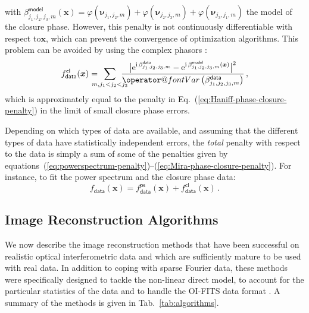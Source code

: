 \documentclass{article}
\makeatletter
\newcommand{\MathFunc}[1]{\mathop{\operator@font #1}\nolimits}
\newcommand{\Tag}[1]{\mathsf{#1}}        %
\newcommand{\V}[1]{\boldsymbol{#1}}      %
\newcommand{\Var}{\MathFunc{Var}}        %
\newcommand{\mathe}{\mathrm{e}}
\newcommand{\mathi}{\mathrm{i}}
\newcommand{\Paren}[1]{\left(#1\right)}
\newcommand{\wrt}{with respect to\xspace}
\newcommand{\Eq}[1]{Eq.~(\ref{#1})}
\newcommand{\Tab}[1]{Tab.~\ref{#1}}
\newcommand{\VisPhase}{\varphi}
\newcommand{\PhaseClosure}{\beta}
\newcommand{\Freq}{\nu}               %
\newcommand{\VFreq}{\V{\Freq}}
\newcommand{\Param}{x}
\newcommand{\VParam}{\V{\Param}}
\newcommand{\DataTag}{\Tag{data}}
\newcommand{\ModelTag}{\Tag{model}}
\newcommand{\PowerspectrumTag}{\Tag{ps}}
\newcommand{\PhaseClosureTag}{\Tag{cl}}
\newcommand{\Fcost}{f}
\newcommand{\Fdata}{\Fcost_\DataTag}
\makeatother
\begin{document}
with $\PhaseClosure_{j_1,j_2,j_3,m}^\ModelTag(\VParam) =
\VisPhase(\VFreq_{j_1,j_2,m}) + \VisPhase(\VFreq_{j_2,j_3,m}) +
\VisPhase(\VFreq_{j_3,j_1,m})$ the model of the closure phase.  However, this
penalty is not continuously differentiable \wrt $\VParam$, which can prevent
the convergence of optimization algorithms.  This problem can be avoided by
using the complex phasors \citep{Thiebaut-2008-Marseille}:
\begin{equation}
  \label{eq:Mira-phase-closure-penalty}
  \Fdata^\PhaseClosureTag(\VParam) =
  \hspace{-1em}\sum_{m, j_1 < j_2 < j_3}\hspace{-1em}
  \frac{
    \bigl\vert
      \mathe^{\mathi\,\PhaseClosure_{j_1,j_2,j_3,m}^\DataTag}
    - \mathe^{\mathi\,\PhaseClosure_{j_1,j_2,j_3,m}^\ModelTag(\VParam)}
    \bigr\vert^2
  }{\Var\Paren{\PhaseClosure_{j_1,j_2,j_3,m}^\DataTag}} \, ,
\end{equation}
which is approximately equal to the penalty in
\Eq{eq:Haniff-phase-closure-penalty} in the limit of small closure phase
errors.

Depending on which types of data are available, and assuming that the
different types of data have statistically independent errors, the
\emph{total} penalty \wrt the data is simply a sum of some of the penalties
given by
equations~(\ref{eq:powerspectrum-penalty})--(\ref{eq:Mira-phase-closure-penalty}).
For instance, to fit the power spectrum and the closure phase data:
\begin{equation}
  \Fdata(\VParam) = \Fdata^\PowerspectrumTag(\VParam) +
  \Fdata^\PhaseClosureTag(\VParam) \, .
\end{equation}


\subsection{Image Reconstruction Algorithms}
\label{sec:new-methods}

We now describe the image reconstruction methods that have been successful on
realistic optical interferometric data and which are sufficiently mature to be
used with real data.  In addition to coping with sparse Fourier data, these
methods were specifically designed to tackle the non-linear direct model, to
account for the particular statistics of the data
\citep{Meimon_et_al-2005-convex_approximation} and to handle the OI-FITS data
format \citep{Pauls_et_al-2005-oifits}. A summary of the methods is given in
\Tab{tab:algorithms}.
\end{document}
